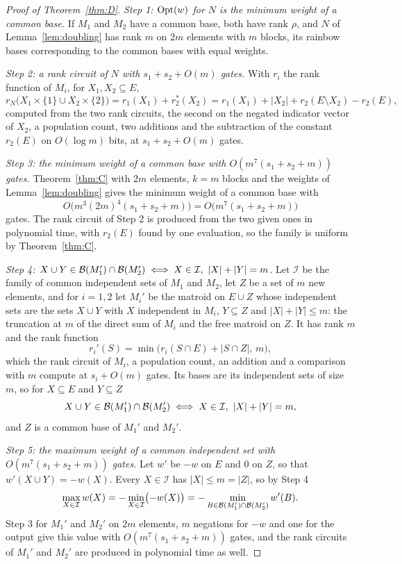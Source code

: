\begin{proof}[Proof of Theorem~\ref{thm:D}]
\emph{Step 1: $\operatorname{Opt}(w)$ for $N$ is the minimum weight of a common base.}  If $M_1$ and $M_2$ have a common base, both have
rank $\rho$, and $N$ of Lemma~\ref{lem:doubling} has rank $m$ on $2m$ elements
with $m$ blocks, its rainbow bases corresponding to the common bases with equal
weights.

\emph{Step 2: a rank circuit of $N$ with $s_1+s_2+O(m)$ gates.}  With $r_i$ the rank function of $M_i$, for
$X_1,X_2\subseteq E$,
\[
  r_N\bigl(X_1\times\{1\}\cup X_2\times\{2\}\bigr)=r_1(X_1)+r_2^{*}(X_2)=r_1(X_1)+|X_2|+r_2(E\setminus X_2)-r_2(E),
\]
computed from the two rank circuits, the second on the negated indicator vector
of $X_2$, a population count, two additions and the subtraction of the constant
$r_2(E)$ on $O(\log m)$ bits, at $s_1+s_2+O(m)$ gates.

\emph{Step 3: the minimum weight of a common base with $O(m^{7}(s_1+s_2+m))$ gates.}  Theorem~\ref{thm:C} with $2m$ elements, $k=m$
blocks and the weights of Lemma~\ref{lem:doubling} gives the minimum weight of a
common base with
\[
  O\bigl(m^{3}(2m)^{4}(s_1+s_2+m)\bigr)=O\bigl(m^{7}(s_1+s_2+m)\bigr)
\]
gates.  The rank circuit of Step 2 is produced from the two given ones in
polynomial time, with $r_2(E)$ found by one evaluation, so the family is uniform
by Theorem~\ref{thm:C}.

\emph{Step 4: $X\cup Y\in\Bases(M_1')\cap\Bases(M_2')\iff X\in\mathcal I,\ |X|+|Y|=m$.}  Let $\mathcal I$ be the family of common
independent sets of $M_1$ and $M_2$, let $Z$ be a set of $m$ new elements, and
for $i=1,2$ let $M_i'$ be the matroid on $E\cup Z$ whose independent sets are the
sets $X\cup Y$ with $X$ independent in $M_i$, $Y\subseteq Z$ and
$|X|+|Y|\le m$: the truncation at $m$ of the direct sum of $M_i$ and the free
matroid on $Z$.  It has rank $m$ and the rank function
\[
  r_i'(S)=\min\bigl(r_i(S\cap E)+|S\cap Z|,\,m\bigr),
\]
which the rank circuit of $M_i$, a population count, an addition and a
comparison with $m$ compute at $s_i+O(m)$ gates.  Its bases are its independent
sets of size $m$, so for $X\subseteq E$ and $Y\subseteq Z$
\[
  X\cup Y\in\mathcal B(M_1')\cap\mathcal B(M_2')\iff X\in\mathcal I,\ |X|+|Y|=m,
\]
and $Z$ is a common base of $M_1'$ and $M_2'$.

\emph{Step 5: the maximum weight of a common independent set with $O(m^{7}(s_1+s_2+m))$ gates.}  Let $w'$ be $-w$ on $E$ and $0$ on $Z$, so
that $w'(X\cup Y)=-w(X)$.  Every $X\in\mathcal I$ has $|X|\le m=|Z|$, so by Step 4
\[
  \max_{X\in\mathcal I}w(X)=-\min_{X\in\mathcal I}\bigl(-w(X)\bigr)
  =-\min_{B\in\mathcal B(M_1')\cap\mathcal B(M_2')}w'(B).
\]
Step 3 for $M_1'$ and $M_2'$ on $2m$ elements, $m$ negations for $-w$ and one
for the output give this value with $O(m^{7}(s_1+s_2+m))$ gates, and the rank
circuits of $M_1'$ and $M_2'$ are produced in polynomial time as well.
\end{proof}

